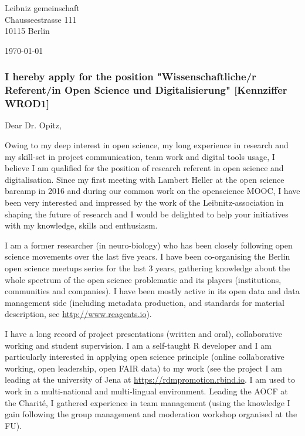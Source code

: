 \hspace*{0.5\linewidth}
\begin{minipage}{0.4\linewidth}
Leibniz gemeinschaft\\
Chausseestrasse 111\\
10115 Berlin


\end{minipage}


\today


%
\subsubsection* {I hereby apply for the position "Wissenschaftliche/r Referent/in Open Science und Digitalisierung" [Kennziffer WROD1]
}
  

Dear Dr. Opitz,

Owing to my deep interest in open science, my long experience in research and my skill-set in project communication, team work and digital tools usage, I believe I am qualified for the position of research referent in open science and digitalisation. Since my first meeting with Lambert Heller at the  open science barcamp in 2016 and during our common work on the openscience MOOC, I have been very interested and impressed by the work of the Leibnitz-association in shaping the future of research and I would be delighted to help your initiatives with my knowledge, skills and enthusiasm.

I am a former researcher (in neuro-biology) who has been closely following open science movements over the last five years. I have been co-organising the Berlin open science meetups series for the last 3 years, gathering knowledge about the whole spectrum of the open science problematic and its players (institutions, communities and companies). I have been mostly active in its open data and data management side (including metadata production, and standards for material description, see \url{http://www.reagents.io}).

I have a long record of project presentations (written and oral), collaborative working and student supervision. I am a self-taught R developer and I am particularly interested in applying open science principle (online collaborative working, open leadership, open FAIR data) to my work (see the project I am leading at the university of Jena at  \url{https://rdmpromotion.rbind.io}. I am used to work in a multi-national and multi-lingual environment. Leading the AOCF at the Charit\'{e},  I gathered experience in team management (using the knowledge I gain following the group management and moderation workshop organised at the FU). 

